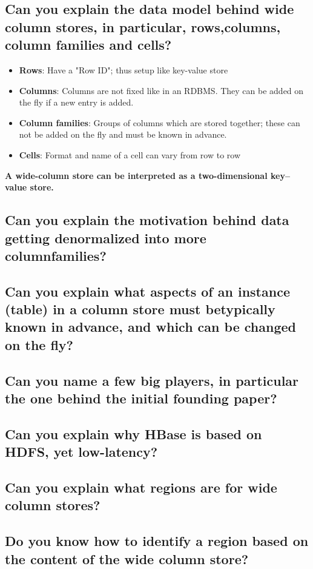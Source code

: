 \documentclass{article}
\begin{document}
\subsection{Can you explain the data model behind wide column stores, in particular, rows,columns, column families and cells?}

\begin{itemize}
\item \textbf{Rows}: Have a "Row ID"; thus setup like key-value store 
\item \textbf{Columns}: Columns are not fixed like in an RDBMS. They can be added on the fly if a new entry is added. 
\item \textbf{Column families}: Groups of columns which are stored together; these can not be added on the fly and must be known in advance. 
\item \textbf{Cells}: Format and name of a cell can vary from row to row
\end{itemize}

\textbf{A wide-column store can be interpreted as a two-dimensional key–value store.}

\subsection{Can you explain the motivation behind data getting denormalized into more columnfamilies?}
\subsection{Can you explain what aspects of an instance (table) in a column store must betypically known in advance, and which can be changed on the fly?}
\subsection{Can you name a few big players, in particular the one behind the initial founding paper?}
\subsection{Can you explain why HBase is based on HDFS, yet low-latency?}
\subsection{Can you explain what regions are for wide column stores?}
\subsection{Do you know how to identify a region based on the content of the wide column store?}
\end{document}
